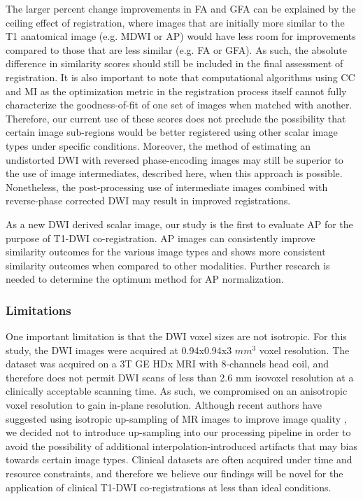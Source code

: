 The larger percent change improvements in FA and GFA can be explained by the ceiling effect of registration, where images that are initially more similar to the T1 anatomical image (e.g. MDWI or AP) would have less room for improvements compared to those that are less similar (e.g. FA or GFA). As such, the absolute difference in similarity scores should still be included in the final assessment of registration. It is also important to note that computational algorithms using CC and MI as the optimization metric in the registration process itself cannot fully characterize the goodness-of-fit of one set of images when matched with another. Therefore, our current use of these scores does not preclude the possibility that certain image sub-regions would be better registered using other scalar image types under specific conditions. Moreover, the method of estimating an undistorted DWI with reversed phase-encoding images may still be superior to the use of image intermediates, described here, when this approach is possible. Nonetheless, the post-processing use of intermediate images combined with reverse-phase corrected DWI may result in improved registrations.

As a new DWI derived scalar image, our study is the first to evaluate AP for the purpose of T1-DWI co-registration. AP images can consistently improve similarity outcomes for the various image types and shows more consistent similarity outcomes when compared to other modalities. Further research is needed to determine the optimum method for AP normalization. 

\subsubsection{Limitations}

One important limitation is that the DWI voxel sizes are not isotropic. For this study, the DWI images were acquired at 0.94x0.94x3 $mm^3$ voxel resolution. The dataset was acquired on a 3T GE HDx MRI with 8-channels head coil, and therefore does not permit DWI scans of less than 2.6 mm isovoxel resolution at a clinically acceptable scanning time. As such, we compromised on an anisotropic voxel resolution to gain in-plane resolution. Although recent authors have suggested using isotropic up-sampling of MR images to improve image quality \cite{Dyrby2014}, we decided not to introduce up-sampling into our processing pipeline in order to avoid the possibility of additional interpolation-introduced artifacts that may bias towards certain image types.  Clinical datasets are often acquired under time and resource constraints, and therefore we believe our findings will be novel for the application of clinical T1-DWI co-registrations at less than ideal conditions.

